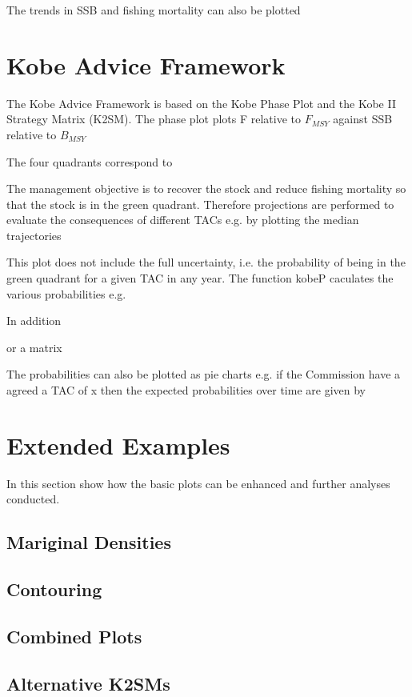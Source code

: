 \documentclass[a4paper, 11pt, oldtoc]{artikel1}
\begin{document}
The trends in SSB and fishing mortality can also be plotted



\section*{Kobe Advice Framework}

The Kobe Advice Framework is based on the Kobe Phase Plot and the Kobe II Strategy Matrix (K2SM). 
The phase plot plots F relative to $F_{MSY}$ against SSB relative to $B_{MSY}$


The four quadrants correspond to

The management objective is to recover the stock and reduce fishing mortality so that the stock is in the green quadrant. Therefore
projections are performed to evaluate the consequences of different TACs e.g. by plotting the median trajectories

This plot does not include the full uncertainty, i.e. the probability of being in the green quadrant for a given TAC in any year.
The function kobeP caculates the various probabilities e.g. 

In addition 


or a matrix


The probabilities can also be plotted as pie charts e.g. if the Commission have a agreed a TAC of x then the expected probabilities over time are given by


\section*{Extended Examples}

In this section show how the basic plots can be enhanced and further analyses conducted.

\subsection*{Mariginal Densities}


\subsection*{Contouring}

\subsection*{Combined Plots}

\subsection*{Alternative K2SMs}
\end{document}
